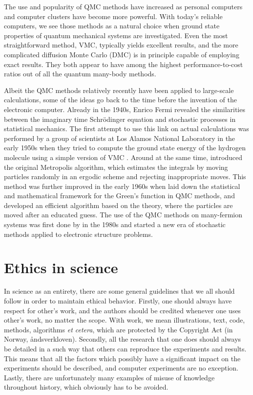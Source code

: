 The use and popularity of QMC methods have increased as personal computers and computer clusters have become more powerful. With today's reliable computers, we see those methods as a natural choice when ground state properties of quantum mechanical systems are investigated. Even the most straightforward method, VMC, typically yields excellent results, and the more complicated diffusion Monte Carlo (DMC) is in principle capable of employing exact results. They both appear to have among the highest performance-to-cost ratios out of all the quantum many-body methods. 

Albeit the QMC methods relatively recently have been applied to large-scale calculations, some of the ideas go back to the time before the invention of the electronic computer. Already in the 1940s, Enrico Fermi revealed the similarities between the imaginary time Schrödinger equation and stochastic processes in statistical mechanics. The first attempt to use this link on actual calculations was performed by a group of scientists at Los Alamos National Laboratory in the early 1950s when they tried to compute the ground state energy of the hydrogen molecule using a simple version of VMC \supercite{bajdich_electronic_2010}. Around at the same time, \citet{metropolis_monte_1949} introduced the original Metropolis algorithm, which estimates the integrals by moving particles randomly in an ergodic scheme and rejecting inappropriate moves. This method was further improved in the early 1960s when \citet{kalos} laid down the statistical and mathematical framework for the Green's function in QMC methods, and \citet{hastings_monte_1970} developed an efficient algorithm based on the theory, where the particles are moved after an educated guess. The use of the QMC methods on many-fermion systems was first done by \citet{ceperley_quantum_1986} in the 1980s and started a new era of stochastic methods applied to electronic structure problems. 

\section{Ethics in science}
In science as an entirety, there are some general guidelines that we all should follow in order to maintain ethical behavior. Firstly, one should always have respect for other's work, and the authors should be credited whenever one uses other's work, no matter the scope. With work, we mean illustrations, text, code, methods, algorithms \textit{et cetera}, which are protected by the Copyright Act (in Norway, åndsverkloven). Secondly, all the research that one does should always be detailed in a such way that others can reproduce the experiments and results. This means that all the factors which possibly have a significant impact on the experiments should be described, and computer experiments are no exception. Lastly, there are unfortunately many examples of misuse of knowledge throughout history, which obviously has to be avoided.

